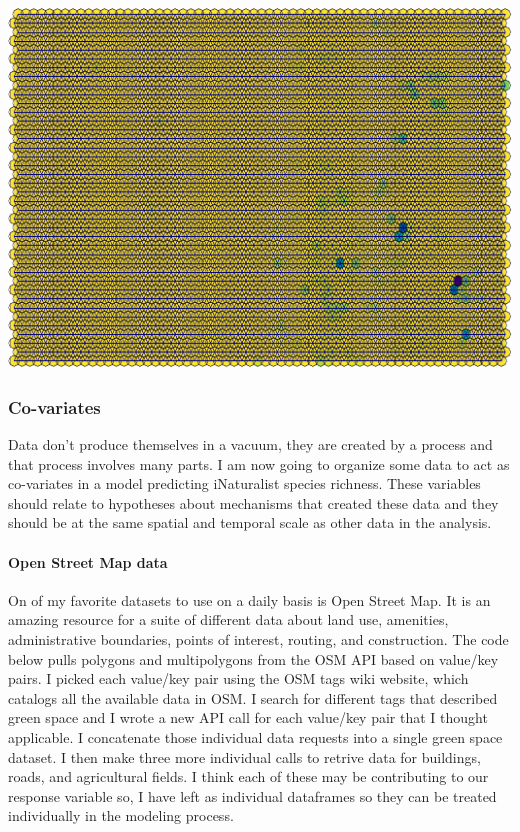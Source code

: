 \documentclass[
]{article}
\begin{document}
\includegraphics{Earth_Lab_application_files/figure-latex/unnamed-chunk-10-1.pdf}

\hypertarget{co-variates}{%
\subsubsection{Co-variates}\label{co-variates}}

Data don't produce themselves in a vacuum, they are created by a process
and that process involves many parts. I am now going to organize some
data to act as co-variates in a model predicting iNaturalist species
richness. These variables should relate to hypotheses about mechanisms
that created these data and they should be at the same spatial and
temporal scale as other data in the analysis.

\hypertarget{open-street-map-data}{%
\paragraph{Open Street Map data}\label{open-street-map-data}}

On of my favorite datasets to use on a daily basis is Open Street Map.
It is an amazing resource for a suite of different data about land use,
amenities, administrative boundaries, points of interest, routing, and
construction. The code below pulls polygons and multipolygons from the
OSM API based on value/key pairs. I picked each value/key pair using the
OSM tags wiki website, which catalogs all the available data in OSM. I
search for different tags that described green space and I wrote a new
API call for each value/key pair that I thought applicable. I
concatenate those individual data requests into a single green space
dataset. I then make three more individual calls to retrive data for
buildings, roads, and agricultural fields. I think each of these may be
contributing to our response variable so, I have left as individual
dataframes so they can be treated individually in the modeling process.
\end{document}
